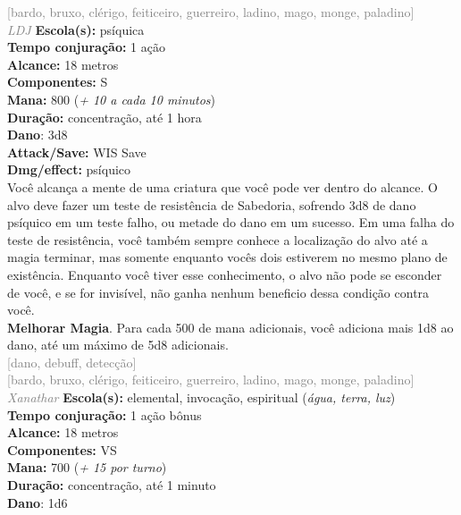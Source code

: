 \documentclass{RPG_Adventure}[2021/10/20]
\begin{document}
{\scriptsize \textcolor{gray}{[bardo, bruxo, clérigo, feiticeiro, guerreiro, ladino, mago, monge, paladino]\\}}
{\tiny \textcolor{gray}{\textit{LDJ}}}
{\small \t \textbf{Escola(s):} psíquica\\\t \textbf{Tempo conjuração:} 1 ação\\\t \textbf{Alcance:} 18 metros\\\t \textbf{Componentes:} S\\\t \textbf{Mana:} 800 (\textit{+ 10 a cada 10 minutos})\\\t \textbf{Duração:} concentração, até 1 hora\\\t \textbf{Dano}: 3d8\\\t \textbf{Attack/Save:} WIS Save\\\t \textbf{Dmg/effect:} psíquico\\}
{\normalsize Você alcança a mente de uma criatura que você pode ver dentro do alcance. O alvo deve fazer um teste de resistência de Sabedoria, sofrendo 3d8 de dano psíquico em um teste falho, ou metade do dano em um sucesso. Em uma falha do teste de resistência, você também sempre conhece a localização do alvo até a magia terminar, mas somente enquanto vocês dois estiverem no mesmo plano de existência. Enquanto você tiver esse conhecimento, o alvo não pode se esconder de você, e se for invisível, não ganha nenhum beneficio dessa condição contra você.\\\t \textbf{Melhorar Magia}. Para cada 500 de mana adicionais, você adiciona mais 1d8 ao dano, até um máximo de 5d8 adicionais.\\}
{\scriptsize \textcolor{gray}{[dano, debuff, detecção]\\}}
{\scriptsize \textcolor{gray}{[bardo, bruxo, clérigo, feiticeiro, guerreiro, ladino, mago, monge, paladino]\\}}
{\tiny \textcolor{gray}{\textit{Xanathar}}}
{\small \t \textbf{Escola(s):} elemental, invocação, espiritual (\textit{água, terra, luz})\\\t \textbf{Tempo conjuração:} 1 ação bônus\\\t \textbf{Alcance:} 18 metros\\\t \textbf{Componentes:} VS\\\t \textbf{Mana:} 700 (\textit{+ 15 por turno})\\\t \textbf{Duração:} concentração, até 1 minuto\\\t \textbf{Dano}: 1d6\\}
\end{document}
